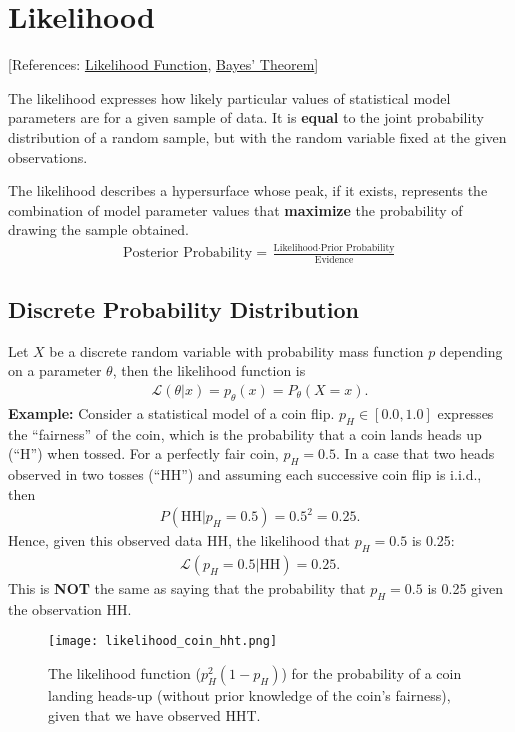 \documentclass[../statistics.tex]{subfiles}
\begin{document}
\chapter{Likelihood}%
\label{sec:likelihood}
[References:
\href{https://en.wikipedia.org/wiki/Likelihood_function}{Likelihood Function},
\href{https://en.wikipedia.org/wiki/Bayes'_theorem}{Bayes' Theorem}]

\noindent
The likelihood expresses how likely particular values of statistical model
parameters are for a given sample of data. It is \textbf{equal} to the joint
probability distribution of a random sample, but with the random variable fixed
at the given observations.

The likelihood describes a hypersurface whose peak, if it exists, represents
the combination of model parameter values that \textbf{maximize} the
probability of drawing the sample obtained.
%
\begin{align*}
  \text{Posterior Probability} = \frac{\text{Likelihood} \cdot \text{Prior Probability}}{\text{Evidence}}
\end{align*}


\section{Discrete Probability Distribution}%
\label{sec:discrete_probability_distribution}
Let $X$ be a discrete random variable with probability mass function $p$
depending on a parameter $\theta$, then the likelihood function is
%
\begin{align*}
  \mathcal{L}(\theta \vert x) = p_{\theta}(x) = P_{\theta}(X = x).
\end{align*}
%
\textbf{Example:} Consider a statistical model of a coin flip.
$p_H \in [0.0, 1.0]$ expresses the ``fairness'' of the coin, which is the
probability that a coin lands heads up (``H'') when tossed. For a perfectly
fair coin, $p_H = 0.5$. In a case that two heads observed in two tosses
(``HH'') and assuming each successive coin flip is i.i.d., then
%
\begin{align*}
  P(\text{HH} \vert p_H = 0.5) = 0.5^2 = 0.25.
\end{align*}
%
Hence, given this observed data HH, the likelihood that $p_H = 0.5$ is 0.25:
%
\begin{align*}
  \mathcal{L}(p_H = 0.5 \vert \text{HH}) = 0.25.
\end{align*}
%
This is \textbf{NOT} the same as saying that the probability that $p_H = 0.5$
is 0.25 given the observation HH\@.
%
\begin{figure}[htpb]
  \centering
  \texttt{[image: likelihood\_coin\_hht.png]}
  \caption{The likelihood function ($p^2_H(1-p_H)$) for the probability of a
    coin landing heads-up (without prior knowledge of the coin's fairness),
    given that we have observed HHT.}%
  \label{fig:likelihood_coin_hht}
\end{figure}
\end{document}
